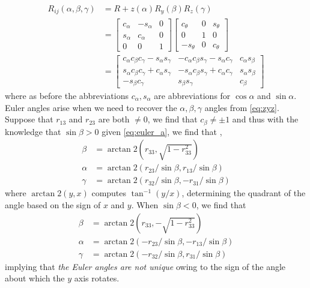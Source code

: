 \begin{align}
	R_{ij}(\alpha, \beta, \gamma) &= R+z(\alpha) R_y(\beta) R_z(\gamma) \\
	& = \begin{bmatrix}
	c_\alpha & -s_\alpha & 0 \\
	s_\alpha & c_\alpha & 0 \\
	0 & 0 & 1
	\end{bmatrix}
	\begin{bmatrix}
	c_\theta  & 0 & s_\theta\\
	0  & 1 & 0 \\
	-s_\theta  & 0 & c_\theta 
	\end{bmatrix} \nonumber \\
	&= \begin{bmatrix}
	c_\alpha c_\beta c_\gamma - s_\alpha s_\gamma & -c_\alpha c_\beta s_\gamma - s_\alpha c_\gamma & c_\alpha s_\beta \\
	s_\alpha c_\beta c_\gamma + c_\alpha s_\gamma & -s_\alpha c_\beta s_\gamma + c_\alpha c_\gamma  & s_\alpha s_\beta \\
	-s_\beta c_\gamma & s_\beta s_\gamma & c_\beta
	\end{bmatrix} 
	\label{eq:zyz}
\end{align}
%
where as before the abbreviations $c_\alpha, s_\alpha$ are abbreviations for $\cos \alpha$ and $\sin \alpha$. Euler angles arise when we need to recover the $\alpha, \beta, \gamma$ angles from \eqref{eq:zyz}. Suppose that $r_{13}$ and $r_{23}$ are both  $\neq 0$, we find that $c_\beta \neq \pm 1$ and thus with the knowledge that $\sin \beta >0$ given \eqref{eq:euler_a}, we find that , 
%
\begin{subequations}
\begin{align}
\beta &= \arctan 2(r_{33}, \sqrt{1 - r_{33}^2})  \label{eq:euler_a}\\
\alpha &= \arctan 2(r_{23}/\sin \beta, r_{13}/\sin \beta) \label{eq:euler_b} \\
\gamma &= \arctan 2 (r_{32}/\sin \beta, -r_{31}/\sin \beta)
\end{align}
\label{eq:euler}
\end{subequations}
%
where $\arctan2(y, x)$ computes $\tan^{-1}(y/x)$, determining the quadrant of the angle based on the sign of $x$ and $y$.
%
When $\sin \beta < 0$, we find that 
%
\begin{subequations}
	\begin{align}
	\beta &=  \arctan2(r_{33}, -\sqrt{1 - r_{33}^2})  \label{eq:euler_neg_a}\\
	\alpha &= \arctan 2(-r_{23}/\sin \beta, -r_{13}/\sin \beta) \label{eq:euler_neg_b} \\
	\gamma &= \arctan 2 (-r_{32}/\sin \beta, r_{31}/\sin \beta)
	\end{align}
	\label{eq:euler_neg}
\end{subequations}
%
implying that \textit{the Euler angles are not unique} owing to the sign of the angle about which the $y$ axis rotates. 

